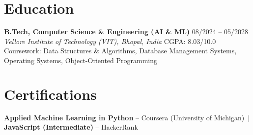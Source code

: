 \documentclass[10pt,letterpaper]{article}
\begin{document}
\section{Education}

{\small\textbf{B.Tech, Computer Science \& Engineering (AI \& ML)} \hfill 08/2024 -- 05/2028 \\
\textit{Vellore Institute of Technology (VIT), Bhopal, India} \hfill CGPA: 8.03/10.0 \\[1pt]
Coursework: Data Structures \& Algorithms, Database Management Systems, Operating Systems, Object-Oriented Programming}

\section{Certifications}
{\small\textbf{Applied Machine Learning in Python} -- Coursera (University of Michigan) \,$|$\, \textbf{JavaScript (Intermediate)} -- HackerRank}
\end{document}
